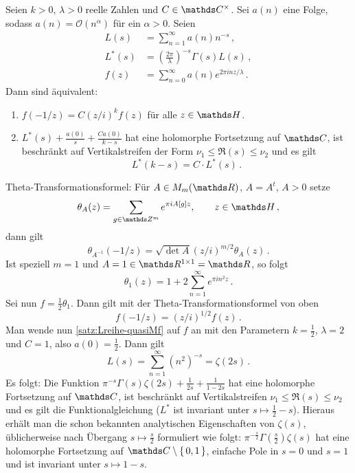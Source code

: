 \begin{satz}\label{satz:Lreihe-quasiMf}
	Seien $k > 0$, $\lambda >0$ reelle Zahlen und $C \in \CC^\times$. Sei $a(n)$ eine Folge, sodass $a(n) = \mathcal O(n^\alpha)$ für ein $\alpha > 0$. Seien
	\begin{align*}
	L(s) &= \sum_{n=1}^\infty a(n)n^{-s} \,,\\
	L^*(s) &= \left( \frac{2\pi}{\lambda}\right)^{-s} \Gamma(s) L(s) \,,\\
	f(z) &= \sum_{n=0}^\infty a(n)e^{2\pi i nz/\lambda} \,.
	\end{align*}
	Dann sind äquivalent: 
	\begin{enumerate}
		\item $f(-1/z) = C (z/i)^{k} f(z)$ für alle $z \in \HH$.
		\item $L^*(s) + \frac{a(0)}{s} + \frac{Ca(0)}{k - s}$ hat eine holomorphe Fortsetzung auf $\CC$, ist beschränkt auf Vertikalstreifen der Form $\nu_1 \leq \Re(s) \leq \nu_2$ und es gilt 
		\[L^*(k - s) = C \cdot L^*(s)\,.\]
	\end{enumerate}
\end{satz}


\begin{bsp}
	Theta-Transformationsformel: Für $A \in M_m(\RR)$, $A = A^t$, $A > 0$ setze
	\[
	\theta_A(z) = \sum_{g \in \ZZ^m} e^{\pi i A[g] z}, \qquad z \in \HH
	\,,
	\]
	dann gilt
	\[
	\theta_{A^{-1}}(-1/z) = \sqrt{\det A} (z / i)^{m/2} \theta_A(z)
	\,.
	\]
	Ist speziell $m = 1$ und $A = 1 \in \RR^{1 \times 1} = \RR$, so folgt 
	\[
	\theta_1(z) = 1 + 2\sum_{n=1}^\infty e^{\pi i n^2 z}
	\,.
	\]
	Sei nun $f = \frac12 \theta_1$. Dann gilt mit der Theta-Transformationsformel von oben
	\[
	f(-1/z) = (z/i)^{1/2} f(z)
	\,.
	\]
	Man wende nun \autoref{satz:Lreihe-quasiMf} auf $f$ an mit den Parametern $k = \frac12$, $\lambda = 2$ und $C = 1$, also $a(0) = \frac12$. Dann gilt
	\[
	L(s) = \sum_{n=1}^\infty (n^{2})^{-s} = \zeta(2s)
	\,.
	\]
	Es folgt: Die Funktion $\pi^{-s} \Gamma(s)\zeta(2s) + \frac{1}{2s} + \frac{1}{1-2s}$ hat eine holomorphe Fortsetzung auf $\CC$, ist beschränkt auf Vertikalstreifen $\nu_1 \leq \Re(s) \leq \nu_2$ und es gilt die Funktionalgleichung ($L^*$ ist invariant unter $s \mapsto \frac 12 - s$). Hieraus erhält man die schon bekannten analytischen Eigenschaften von $\zeta(s)$, üblicherweise nach Übergang $s \mapsto \frac s2$ formuliert wie folgt: $\pi^{- \frac s2}\Gamma(\frac s2)\zeta(s)$ hat eine holomorphe Fortsetzung auf $\CC \setminus \Set {0,1}$, einfache Pole in $s=0$ und $s=1$ und ist invariant unter $s \mapsto 1 - s$.
\end{bsp} 
